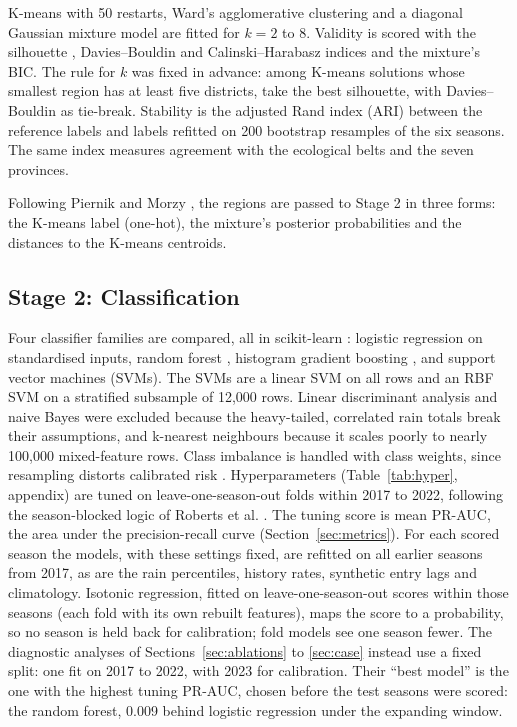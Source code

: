 \documentclass[conference]{IEEEtran}
\begin{document}
K-means \cite{Lloyd1982} with 50 restarts, Ward's agglomerative clustering and a diagonal Gaussian mixture model \cite{Fraley2002} are fitted for $k = 2$ to 8. Validity is scored with the silhouette \cite{Rousseeuw1987}, Davies--Bouldin \cite{Davies1979} and Calinski--Harabasz \cite{Calinski1974} indices and the mixture's BIC. The rule for $k$ was fixed in advance: among K-means solutions whose smallest region has at least five districts, take the best silhouette, with Davies--Bouldin as tie-break. Stability is the adjusted Rand index (ARI) \cite{Hubert1985} between the reference labels and labels refitted on 200 bootstrap resamples of the six seasons. The same index measures agreement with the ecological belts and the seven provinces.

Following Piernik and Morzy \cite{Piernik2021}, the regions are passed to Stage 2 in three forms: the K-means label (one-hot), the mixture's posterior probabilities and the distances to the K-means centroids.

\subsection{Stage 2: Classification}
Four classifier families are compared, all in scikit-learn \cite{Pedregosa2011}: logistic regression \cite{Hosmer2013} on standardised inputs, random forest \cite{Breiman2001}, histogram gradient boosting \cite{Friedman2001}, and support vector machines (SVMs). The SVMs are a linear SVM on all rows and an RBF SVM on a stratified subsample of 12,000 rows. Linear discriminant analysis and naive Bayes were excluded because the heavy-tailed, correlated rain totals break their assumptions, and k-nearest neighbours because it scales poorly to nearly 100,000 mixed-feature rows. Class imbalance is handled with class weights, since resampling distorts calibrated risk \cite{vandenGoorbergh2022}. Hyperparameters (Table~\ref{tab:hyper}, appendix) are tuned on leave-one-season-out folds within 2017 to 2022, following the season-blocked logic of Roberts et al. \cite{Roberts2017}. The tuning score is mean PR-AUC, the area under the precision-recall curve (Section~\ref{sec:metrics}). For each scored season the models, with these settings fixed, are refitted on all earlier seasons from 2017, as are the rain percentiles, history rates, synthetic entry lags and climatology. Isotonic regression, fitted on leave-one-season-out scores within those seasons (each fold with its own rebuilt features), maps the score to a probability, so no season is held back for calibration; fold models see one season fewer. The diagnostic analyses of Sections~\ref{sec:ablations} to \ref{sec:case} instead use a fixed split: one fit on 2017 to 2022, with 2023 for calibration. Their ``best model'' is the one with the highest tuning PR-AUC, chosen before the test seasons were scored: the random forest, 0.009 behind logistic regression under the expanding window.
\end{document}
